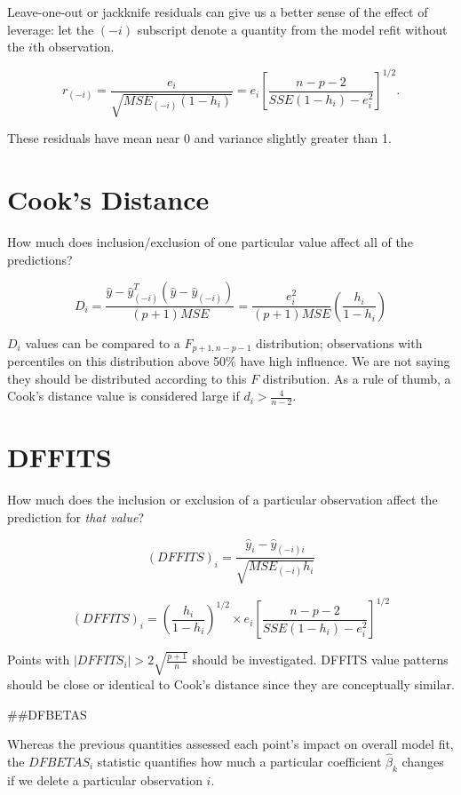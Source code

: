 \documentclass[
  letterpaper,
  DIV=11,
  numbers=noendperiod]{scrreport}
\begin{document}
Leave-one-out or jackknife residuals can give us a better sense of the
effect of leverage: let the \((-i)\) subscript denote a quantity from
the model refit without the \(i\)th observation.

\[r_{(-i)} = \frac{e_i}{\sqrt{MSE_{(-i)}(1-h_i)}} = e_i \left[ \frac{n-p-2}{SSE(1-h_i) - e_i^2}\right]^{1/2}.\]

These residuals have mean near 0 and variance slightly greater than 1.

\hypertarget{cooks-distance-1}{%
\section{Cook's Distance}\label{cooks-distance-1}}

How much does inclusion/exclusion of one particular value affect all of
the predictions?

\[D_i = \frac{\hat y - \hat y_{(-i)}^T(\hat y - \hat y_{(-i)})}{(p+1)MSE} = 
\frac{e^2_i}{(p+1)MSE}\left( \frac{h_i}{1-h_i}\right) \]

\(D_i\) values can be compared to a \(F_{p+1,n-p-1}\) distribution;
observations with percentiles on this distribution above 50\% have high
influence. We are not saying they should be distributed according to
this \(F\) distribution. As a rule of thumb, a Cook's distance value is
considered large if \(d_i > \frac{4}{n-2}\).

\hypertarget{dffits}{%
\section{DFFITS}\label{dffits}}

How much does the inclusion or exclusion of a particular observation
affect the prediction for \emph{that value}?

\[(DFFITS)_i = \frac{\hat y_i - \hat y_{(-i)i}}{\sqrt{MSE_{(-i)}h_i}}\]

\[(DFFITS)_i = \left( \frac{h_i}{1-h_i} \right)^{1/2} \times e_i \left[ \frac{n-p-2}{SSE(1-h_i) - e_i^2}\right]^{1/2}\]

Points with \(|DFFITS_i|>2 \sqrt{\frac{p+1}{n}}\) should be
investigated. DFFITS value patterns should be close or identical to
Cook's distance since they are conceptually similar.

\#\#DFBETAS

Whereas the previous quantities assessed each point's impact on overall
model fit, the \(DFBETAS_i\) statistic quantifies how much a particular
coefficient \(\hat \beta_k\) changes if we delete a particular
observation \(i\).
\end{document}
